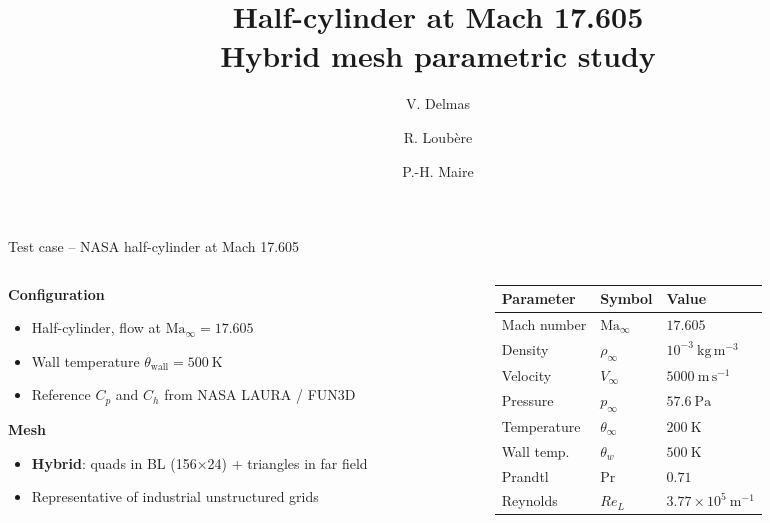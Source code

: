 \documentclass[aspectratio=169, 10pt]{beamer}
\title{Half-cylinder at Mach 17.605\\[4pt] Hybrid mesh parametric study}
\author{V. Delmas \and R. Loub\`ere \and P.-H. Maire}
\institute{Universit\'e de Bordeaux / CEA Cesta}
\date{}
\begin{document}
\begin{frame}
  \titlepage
\end{frame}

\begin{frame}{Test case -- NASA half-cylinder at Mach 17.605~\cite{FUN3D}}
  \begin{columns}[T]
    \begin{column}{0.48\textwidth}
      \textbf{Configuration}
      \begin{itemize}
        \item Half-cylinder, flow at $\mathrm{Ma}_\infty = 17.605$
        \item Wall temperature $\theta_\mathrm{wall} = 500~\mathrm{K}$
        \item Reference $C_p$ and $C_h$ from NASA LAURA / FUN3D
      \end{itemize}
      \bigskip
      \textbf{Mesh}
      \begin{itemize}
        \item \textbf{Hybrid}: quads in BL (156$\times$24) + triangles in far field
        \item Representative of industrial unstructured grids
      \end{itemize}
    \end{column}
    \begin{column}{0.48\textwidth}
      \renewcommand{\arraystretch}{1.2}
      \begin{tabular}{lll}
        \toprule
        Parameter & Symbol & Value \\
        \midrule
        Mach number    & $\mathrm{Ma}_\infty$  & $17.605$ \\
        Density        & $\rho_\infty$         & $10^{-3}~\mathrm{kg\,m^{-3}}$ \\
        Velocity       & $V_\infty$            & $5000~\mathrm{m\,s^{-1}}$ \\
        Pressure       & $p_\infty$            & $57.6~\mathrm{Pa}$ \\
        Temperature    & $\theta_\infty$       & $200~\mathrm{K}$ \\
        Wall temp.     & $\theta_w$            & $500~\mathrm{K}$ \\
        Prandtl        & $\mathrm{Pr}$         & $0.71$ \\
        Reynolds       & $Re_L$                & $3.77\times10^5~\mathrm{m^{-1}}$ \\
        \bottomrule
      \end{tabular}
    \end{column}
  \end{columns}
\end{frame}
\end{document}
